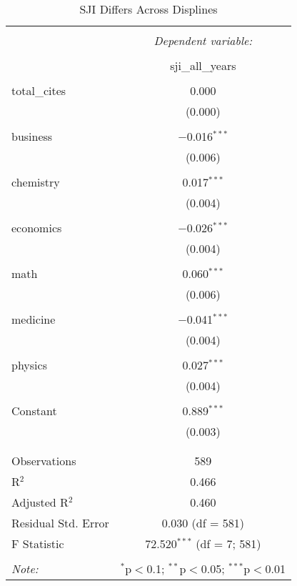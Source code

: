 \documentclass[12pt,english]{article}
\begin{document}
    
\begin{table}[!htbp] \centering 
  \caption{SJI Differs Across Displines} 
  \label{tab:estimates} 
\begin{tabular}{@{\extracolsep{5pt}}lc} 
\\[-1.8ex]\hline 
\hline \\[-1.8ex] 
 & \multicolumn{1}{c}{\textit{Dependent variable:}} \\ 
\cline{2-2} 
\\[-1.8ex] & sji\_all\_years \\ 
\hline \\[-1.8ex] 
 total\_cites & 0.000 \\ 
  & (0.000) \\ 
  & \\ 
 business & $-$0.016$^{***}$ \\ 
  & (0.006) \\ 
  & \\ 
 chemistry & 0.017$^{***}$ \\ 
  & (0.004) \\ 
  & \\ 
 economics & $-$0.026$^{***}$ \\ 
  & (0.004) \\ 
  & \\ 
 math & 0.060$^{***}$ \\ 
  & (0.006) \\ 
  & \\ 
 medicine & $-$0.041$^{***}$ \\ 
  & (0.004) \\ 
  & \\ 
 physics & 0.027$^{***}$ \\ 
  & (0.004) \\ 
  & \\ 
 Constant & 0.889$^{***}$ \\ 
  & (0.003) \\ 
  & \\ 
\hline \\[-1.8ex] 
Observations & 589 \\ 
R$^{2}$ & 0.466 \\ 
Adjusted R$^{2}$ & 0.460 \\ 
Residual Std. Error & 0.030 (df = 581) \\ 
F Statistic & 72.520$^{***}$ (df = 7; 581) \\ 
\hline 
\hline \\[-1.8ex] 
\textit{Note:}  & \multicolumn{1}{r}{$^{*}$p$<$0.1; $^{**}$p$<$0.05; $^{***}$p$<$0.01} \\ 
\end{tabular} 
\end{table} 
\end{document}
